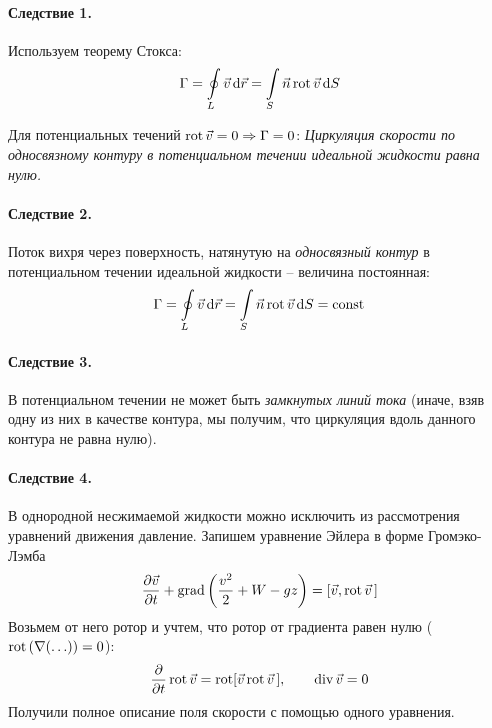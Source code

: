\paragraph{Следствие 1.} Используем теорему Стокса:
\begin{align*}
\Gamma = \oint \limits_ { L } \vec{v} \dd{\vec{r}} = \int \limits_ { S } \vec { n }\operatorname{rot}\vec{v}\dd{S}
\end{align*}

Для потенциальных течений $ \operatorname{rot} \vec{v} = 0 \Rightarrow \Gamma = 0$: \textit{Циркуляция скорости по {односвязному контуру} в потенциальном течении идеальной жидкости равна нулю.}

\paragraph{Следствие 2.} 	Поток вихря через поверхность, натянутую на  \textit{односвязный контур} в потенциальном течении идеальной жидкости -- величина постоянная:
	\begin{align*}
	\Gamma = \oint \limits_ { L } \vec{v} \dd{\vec{r}} = \int \limits_ { S } \vec { n }  \operatorname{rot} \vec{v}\dd{S} = \mathrm{const}\,
	\end{align*}


\paragraph{Следствие 3.} В потенциальном течении не может быть \textit{замкнутых линий тока} (иначе, взяв одну из них в качестве контура, мы получим, что циркуляция вдоль данного контура не равна нулю).

\paragraph{Следствие 4.} В однородной несжимаемой жидкости можно исключить из рассмотрения уравнений движения давление.  Запишем уравнение Эйлера в форме Громэко-Лэмба
\begin{equation}
	\frac { \partial \vec{v} } { \partial t } +\operatorname{grad} \left( \frac { v ^ { 2 } } { 2 } + W - g z \right) = [ \vec{v} , \operatorname{rot} \vec{v}\,]
\end{equation}
Возьмем от него ротор и учтем, что ротор от градиента равен нулю ($\operatorname{rot}\qty(\nabla \qty(\ldots))= 0 $):
\begin{align*}
{ \pdv{t} \operatorname{rot}\vec{v} = \operatorname{rot}[ \vec{v} \operatorname{rot}\vec{v}\, ] }, \qquad
{\operatorname{div}\vec{v} = 0 }
\end{align*}
Получили полное описание поля скорости с помощью одного уравнения.


